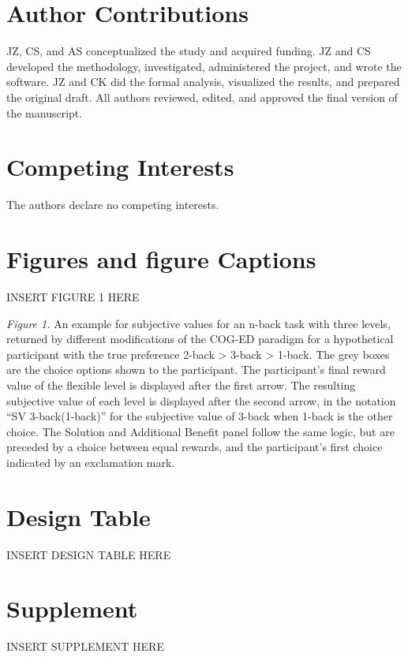 \documentclass[
  man,floatsintext]{apa6}
\begin{document}
\hypertarget{author-contributions}{%
\section{Author Contributions}\label{author-contributions}}

JZ, CS, and AS conceptualized the study and acquired funding.
JZ and CS developed the methodology, investigated, administered the project, and wrote the software.
JZ and CK did the formal analysis, visualized the results, and prepared the original draft.
All authors reviewed, edited, and approved the final version of the manuscript.

\hypertarget{competing-interests}{%
\section{Competing Interests}\label{competing-interests}}

The authors declare no competing interests.

\newpage
\setcounter{figure}{0}

\hypertarget{figures-and-figure-captions}{%
\section{Figures and figure Captions}\label{figures-and-figure-captions}}

INSERT FIGURE 1 HERE

\emph{Figure 1.} An example for subjective values for an n-back task with three levels, returned by different modifications of the COG-ED paradigm for a hypothetical participant with the true preference 2-back \textgreater{} 3-back \textgreater{} 1-back. The grey boxes are the choice options shown to the participant. The participant's final reward value of the flexible level is displayed after the first arrow. The resulting subjective value of each level is displayed after the second arrow, in the notation ``SV 3-back(1-back)'' for the subjective value of 3-back when 1-back is the other choice. The Solution and Additional Benefit panel follow the same logic, but are preceded by a choice between equal rewards, and the participant's first choice indicated by an exclamation mark.

\newpage

\hypertarget{DesignTableSection}{%
\section{Design Table}\label{DesignTableSection}}

INSERT DESIGN TABLE HERE
\newpage

\hypertarget{supplement}{%
\section{Supplement}\label{supplement}}

INSERT SUPPLEMENT HERE
\end{document}
